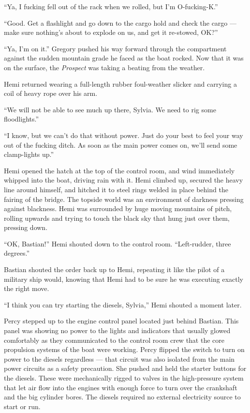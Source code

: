 \documentclass[
]{scrbook}
\begin{document}
``Ya, I fucking fell out of the rack when we rolled, but I'm
O-fucking-K.''

``Good. Get a flashlight and go down to the cargo hold and check the
cargo --- make sure nothing's about to explode on us, and get it
re-stowed, OK?''

``Ya, I'm on it.'' Gregory pushed his way forward through the
compartment against the sudden mountain grade he faced as the boat
rocked. Now that it was on the surface, the \emph{Prospect} was taking a
beating from the weather.

Hemi returned wearing a full-length rubber foul-weather slicker and
carrying a coil of heavy rope over his arm.

``We will not be able to see much up there, Sylvia. We need to rig some
floodlights.''

``I know, but we can't do that without power. Just do your best to feel
your way out of the fucking ditch. As soon as the main power comes on,
we'll send some clamp-lights up.''

Hemi opened the hatch at the top of the control room, and wind
immediately whipped into the boat, driving rain with it. Hemi climbed
up, secured the heavy line around himself, and hitched it to steel rings
welded in place behind the fairing of the bridge. The topside world was
an environment of darkness pressing against blackness. Hemi was
surrounded by huge moving mountains of pitch, rolling upwards and trying
to touch the black sky that hung just over them, pressing down.

``OK, Bastian!'' Hemi shouted down to the control room. ``Left-rudder,
three degrees.''

Bastian shouted the order back up to Hemi, repeating it like the pilot
of a military ship would, knowing that Hemi had to be sure he was
executing exactly the right move.

``I think you can try starting the diesels, Sylvia,'' Hemi shouted a
moment later.

Percy stepped up to the engine control panel located just behind
Bastian. This panel was showing no power to the lights and indicators
that usually glowed comfortably as they communicated to the control room
crew that the core propulsion systems of the boat were working. Percy
flipped the switch to turn on power to the diesels regardless --- that
circuit was also isolated from the main power circuits as a safety
precaution. She pushed and held the starter buttons for the diesels.
These were mechanically rigged to valves in the high-pressure system
that let air flow into the engines with enough force to turn over the
crankshaft and the big cylinder bores. The diesels required no external
electricity source to start or run.
\end{document}
